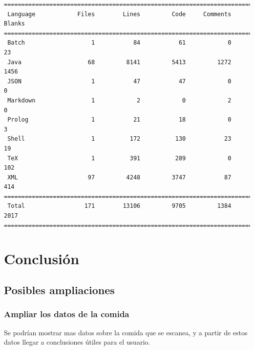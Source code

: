 \documentclass[12pt,a4paper]{article}
\begin{document}
\begin{verbatim}
===============================================================================
 Language            Files        Lines         Code     Comments       Blanks
===============================================================================
 Batch                   1           84           61            0           23
 Java                   68         8141         5413         1272         1456
 JSON                    1           47           47            0            0
 Markdown                1            2            0            2            0
 Prolog                  1           21           18            0            3
 Shell                   1          172          130           23           19
 TeX                     1          391          289            0          102
 XML                    97         4248         3747           87          414
===============================================================================
 Total                 171        13106         9705         1384         2017
===============================================================================
\end{verbatim}

\newpage

\section{Conclusión}

\subsection{Posibles ampliaciones}

\subsubsection{Ampliar los datos de la comida}
Se podrían mostrar mas datos sobre la comida que se escanea, y a partir de estos datos llegar a conclusiones útiles para el usuario.
\end{document}
